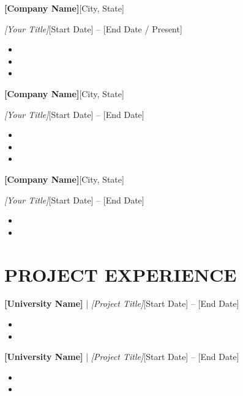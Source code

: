 \documentclass[10pt,letterpaper]{article}
\newenvironment{resumeentrywide}[4]{%
\vspace{1pt}\textbf{#1}\hfill {\small #2}\par
\textit{#3}\hfill {\small #4}\par
}{\vspace{0pt}}
\newenvironment{resumeproject}[3]{%
\textbf{#1} | \textit{#2}\hfill {\small #3}\par
}{\vspace{0pt}}
\begin{document}
\begin{resumeentrywide}
{[Company Name]}{[City, State]}
{[Your Title]}{[Start Date] – [End Date / Present]}
\end{resumeentrywide}
\begin{itemize}
\item 
\item 
\item 
\end{itemize}
\vspace{6pt}

\begin{resumeentrywide}
{[Company Name]}{[City, State]}
{[Your Title]}{[Start Date] – [End Date]}
\end{resumeentrywide}
\begin{itemize}
\item 
\item 
\item 
\end{itemize}
\vspace{6pt}

\begin{resumeentrywide}
{[Company Name]}{[City, State]}
{[Your Title]}{[Start Date] – [End Date]}
\end{resumeentrywide}
\begin{itemize}
\item 
\item 
\end{itemize}
\vspace{6pt}

\section*{PROJECT EXPERIENCE}

\begin{resumeproject}{[University Name]}{[Project Title]}{[Start Date] – [End Date]}\end{resumeproject}
\begin{itemize}
\item 
\item 
\end{itemize}
\vspace{6pt}

\begin{resumeproject}{[University Name]}{[Project Title]}{[Start Date] – [End Date]}\end{resumeproject}
\begin{itemize}
\item 
\item 
\end{itemize}
\end{document}
